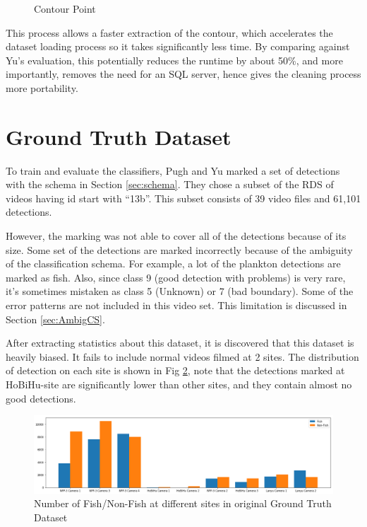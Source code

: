 \documentclass[bsc,frontabs,twoside,fullspacing,parskip,deptreport]{infthesis}
\begin{document}
\begin{figure}[!ht]
\begin{minipage}[t]{0.3 \linewidth}
		\caption{\footnotesize Contour Point}
		\label{fig:bbcc3}
	\end{minipage}
\end{figure}

\vspace{-20pt}

This process allows a faster extraction of the contour, which accelerates the dataset loading process so it takes significantly less time. 
By comparing against Yu's\cite{Yu} evaluation, this potentially reduces the runtime by about 50\%, and more importantly, removes the need for an SQL server, hence gives the cleaning process more portability.


\vspace{-10pt}

\section{Ground Truth Dataset}
\label{sec:gt}

\vspace{-10pt}

To train and evaluate the classifiers, Pugh and Yu marked a set of detections with the schema in Section \ref{sec:schema}. 
They chose a subset of the RDS of videos having id start with ``13b''. This subset consists of 39 video files and 61,101 detections. 

However, the marking was not able to cover all of the detections because of its size. 
Some set of the detections are marked incorrectly because of the ambiguity of the classification schema. 
For example, a lot of the plankton detections are marked as fish. 
Also, since class 9 (good detection with problems) is very rare, it's sometimes mistaken as class 5 (Unknown) or 7 (bad boundary). Some of the error patterns are not included in this video set. This limitation is discussed in Section \ref{sec:AmbigCS}.

After extracting statistics about this dataset, it is discovered that this dataset is heavily biased. 
It fails to include normal videos filmed at 2 sites. The distribution of detection on each site is shown in Fig \ref{fig:gtdist}, note that the detections marked at HoBiHu-site are significantly lower than other sites, and they contain almost no good detections.

\vspace{-5pt}

\begin{figure}[h]
    \centering
    \includegraphics[scale=0.34]{graph/classdist.png}
    \caption{Number of Fish/Non-Fish at different sites in original Ground Truth Dataset}
    \label{fig:gtdist}
\end{figure}
\end{document}

